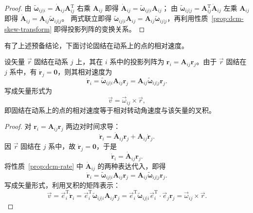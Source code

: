 \begin{proof}
	由 $\tilde{\boldsymbol{\omega}}_{ij|i}=\dot{\boldsymbol{A}}_{ij}\boldsymbol{A}_{ij}^{\mathrm{T}}$ 右乘 $\boldsymbol{A}_{ij}$ 即得 $\dot{\boldsymbol{A}}_{ij}=\tilde{\boldsymbol{\omega}}_{ij|i}\boldsymbol{A}_{ij}$；
	由 $\tilde{\boldsymbol{\omega}}_{ij|j}=\boldsymbol{A}_{ij}^{\mathrm{T}}\dot{\boldsymbol{A}}_{ij}$ 左乘 $\boldsymbol{A}_{ij}$ 即得 $\dot{\boldsymbol{A}}_{ij}=\boldsymbol{A}_{ij}\tilde{\boldsymbol{\omega}}_{ij|j}$。
	两式联立即得 $\tilde{\boldsymbol{\omega}}_{ij|i}\boldsymbol{A}_{ij}=\boldsymbol{A}_{ij}\tilde{\boldsymbol{\omega}}_{ij|j}$，再利用性质~\ref{prop:dcm-skew-transform} 即得投影列阵的变换关系。
\end{proof}

有了上述预备结论，下面讨论固结在动系上的点的相对速度。

\begin{theorem}[固结矢量的相对速度]\label{thm:relative-velocity}
	设矢量 $\vec{r}$ 固结在动系 $j$ 上，其在 $i$ 系中的投影列阵为 $\boldsymbol{r}_i=\boldsymbol{A}_{ij}\boldsymbol{r}_j$。由于 $\vec{r}$ 固结在 $j$ 系中，有 $\dot{\boldsymbol{r}}_j=\boldsymbol{0}$，则其相对速度为
	$$
	\dot{\boldsymbol{r}}_i=\tilde{\boldsymbol{\omega}}_{ij|i}\boldsymbol{A}_{ij}\boldsymbol{r}_j=\boldsymbol{A}_{ij}\tilde{\boldsymbol{\omega}}_{ij|j}\boldsymbol{r}_j.
	$$
	写成矢量形式为
	$$
	\vec{v}=\vec{\omega}_{ij}\times\vec{r},
	$$
	即固结在动系上的点的相对速度等于相对转动角速度与该矢量的叉积。
\end{theorem}

\begin{proof}
	对 $\boldsymbol{r}_i=\boldsymbol{A}_{ij}\boldsymbol{r}_j$ 两边对时间求导：
	$$
	\dot{\boldsymbol{r}}_i=\dot{\boldsymbol{A}}_{ij}\boldsymbol{r}_j+\boldsymbol{A}_{ij}\dot{\boldsymbol{r}}_j.
	$$
	因 $\vec{r}$ 固结在 $j$ 系中，故 $\dot{\boldsymbol{r}}_j=\boldsymbol{0}$，于是
	$$
	\dot{\boldsymbol{r}}_i=\dot{\boldsymbol{A}}_{ij}\boldsymbol{r}_j.
	$$
	将性质~\ref{prop:dcm-rate} 中 $\dot{\boldsymbol{A}}_{ij}$ 的两种表达代入，即得
	$$
	\dot{\boldsymbol{r}}_i=\tilde{\boldsymbol{\omega}}_{ij|i}\boldsymbol{A}_{ij}\boldsymbol{r}_j=\boldsymbol{A}_{ij}\tilde{\boldsymbol{\omega}}_{ij|j}\boldsymbol{r}_j.
	$$
	写成矢量形式，利用叉积的矩阵表示：
	$$
	\vec{v}=\vec{e}_i^{\mathrm{T}}\dot{\boldsymbol{r}}_i
	=\vec{e}_i^{\mathrm{T}}\tilde{\boldsymbol{\omega}}_{ij|i}\boldsymbol{A}_{ij}\boldsymbol{r}_j
	=\vec{e}_i^{\mathrm{T}}\tilde{\boldsymbol{\omega}}_{ij|i}\vec{e}_i^{\mathrm{T}}\cdot\vec{e}_j\boldsymbol{r}_j
	=\vec{\omega}_{ij}\times\vec{r}.
	$$
\end{proof}


